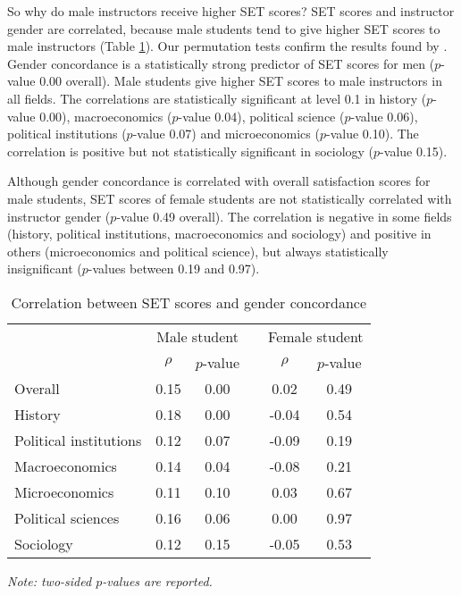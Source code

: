 \documentclass[12pt]{article}
\begin{document}
So why do male instructors receive higher SET scores? 
SET scores and instructor gender are correlated, because male students tend to give higher SET scores to male instructors (Table \ref{tab:genderconcordance}). 
Our permutation tests confirm the results found by \citet{Boring2015}. 
Gender concordance is a statistically strong predictor of SET scores for men ($p$-value 0.00 overall). 
Male students give higher SET scores to male instructors in all fields. 
The correlations are statistically significant at level 0.1 in history ($p$-value 0.00), macroeconomics ($p$-value 0.04), political science ($p$-value 0.06), political institutions ($p$-value 0.07) and 
microeconomics ($p$-value 0.10). 
The correlation is positive but not statistically significant in sociology ($p$-value 0.15). 

Although gender concordance is correlated with overall satisfaction scores for male students, SET scores of female students are not statistically correlated with instructor gender ($p$-value 0.49 overall). The correlation is negative in some fields (history, political institutions, macroeconomics and sociology) and positive in others (microeconomics and political science), but always statistically insignificant ($p$-values between 0.19 and 0.97).



\begin{table}[htbp]
  \centering
  \footnotesize 
  \caption{Correlation between SET scores and gender concordance}
    \begin{tabular}{lccccc}
    \toprule 
          & \multicolumn{2}{c}{Male student}  &  & \multicolumn{2}{c}{Female student} \\
      & $\rho$  &  $p$-value &  & $\rho$  &  $p$-value    \\
   \midrule
      \quad  Overall &                 0.15       & 0.00 & &  0.02       & 0.49      \\
      \quad  History &                 0.18       & 0.00 & & -0.04       & 0.54      \\
      \quad  Political institutions &  0.12       & 0.07 & & -0.09       & 0.19       \\
      \quad  Macroeconomics &          0.14       & 0.04 & & -0.08       & 0.21     \\
      \quad  Microeconomics &          0.11       & 0.10 & &  0.03       & 0.67       \\
      \quad  Political sciences &      0.16       & 0.06 & &  0.00       & 0.97      \\
      \quad  Sociology &               0.12       & 0.15 & & -0.05       & 0.53      \\
    \bottomrule
    \end{tabular}%
 \label{tab:genderconcordance}%
  
  \textit{Note: two-sided $p$-values are reported.}
\end{table}%
\normalsize
\end{document}
